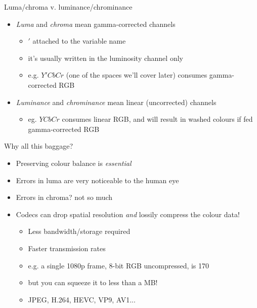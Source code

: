 \documentclass[aspectratio=169,handout,usepdftitle=false]{fireshonks}
\begin{document}
\begin{frame}{Luma/chroma v. luminance/chrominance}
    \begin{itemize}
        \item \emph{Luma} and \emph{chroma} mean gamma-corrected channels
              \begin{itemize}
                  \item $'$ attached to the variable name
                  \item it's usually written in the luminosity channel only
                  \item e.g. $Y'CbCr$ (one of the spaces we'll cover later) consumes gamma-corrected RGB
              \end{itemize}
        \item \emph{Luminance} and \emph{chrominance} mean linear (uncorrected) channels
              \begin{itemize}
                  \item eg. $YCbCr$ consumes linear RGB, and will result in washed colours if fed gamma-corrected RGB
              \end{itemize}
    \end{itemize}
\end{frame}
\begin{frame}{Why all this baggage?}
    \begin{itemize}
        \item Preserving colour balance is \emph{essential}
        \item Errors in luma are very noticeable to the human eye
        \item Errors in chroma? not so much
        \item Codecs can drop spatial resolution \emph{and} lossily compress the colour data!
              \begin{itemize}
                  \item Less bandwidth/storage required
                  \item Faster transmission rates
                  \item e.g. a single 1080p frame, 8-bit RGB uncompressed, is \SI{170}{\mega\byte}
                  \item but you can squeeze it to less than a MB!
                  \item JPEG, H.264, HEVC, VP9, AV1... 
              \end{itemize}
    \end{itemize}
\end{frame}
\end{document}

